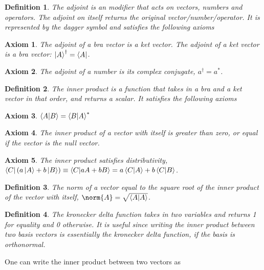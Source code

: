 \documentclass{tufte-book}
\newtheorem{axiom}{Axiom}
\newtheorem{definition}{Definition}
\begin{document}
\begin{definition}
	\label{def:2}
	The adjoint is an modifier that acts on vectors, numbers and operators. The adjoint on itself returns the original vector/number/operator. It is represented by the dagger symbol and satisfies the following axioms
\end{definition}

\begin{axiom}
  \label{ax:9}
  The adjoint of a bra vector is a ket vector. The adjoint of a ket vector is a bra vector: $\ket{A}^{\dag} = \bra{A}$.
\end{axiom}
\begin{axiom}
  \label{ax:10}
  The adjoint of a number is its complex conjugate, $a^{\dag} = a^*$.
\end{axiom}

\begin{definition}
  \label{def:3}
  The inner product is a function that takes in a bra and a ket vector in that order, and returns a scalar. It satisfies the following axioms
\end{definition}

\begin{axiom}
  \label{ax:11}
  $\braket{A|B} = \braket{B|A}^*$
\end{axiom}
\begin{axiom}
  \label{ax:12}
  The inner product of a vector with itself is greater than zero, or equal if the vector is the null vector.
\end{axiom}
\begin{axiom}
  \label{ax:13}
  The inner product satisfies distributivity, $\bra{C}(a\ket{A} + b\ket{B}) \equiv \braket{C|aA + bB} = a\braket{C|A} + b\braket{C|B}$.
\end{axiom}

\begin{definition}
  \label{def:4}
  The norm of a vector equal to the square root of the inner product of the vector with itself, $\norm{A} = \sqrt{\braket{A|A}}$.
\end{definition}

\begin{definition}
  \label{def:5}
  The kronecker delta function takes in two variables and returns 1 for equality and 0 otherwise. It is useful since writing the inner product between two basis vectors is essentially the kronecker delta function, if the basis is orthonormal.
\end{definition}

One can write the inner product between two vectors as
\end{document}
